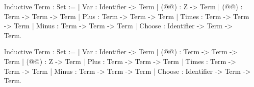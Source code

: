 Inductive Term : Set :=
| Var : Identifier -> Term
| (@@) : Z -> Term
| (@@) : Term -> Term -> Term
| Plus : Term -> Term -> Term
| Times : Term -> Term -> Term
| Minus : Term -> Term -> Term
| Choose : Identifier -> Term -> Term.

Inductive Term : Set :=
| Var : Identifier -> Term
| (@@) : Term -> Term -> Term
| (@@) : Z -> Term
| Plus : Term -> Term -> Term
| Times : Term -> Term -> Term
| Minus : Term -> Term -> Term
| Choose : Identifier -> Term -> Term.

